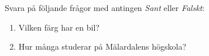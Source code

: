 

\newcommand{\CourseCode}{ABC123}
\newcommand{\CourseName}{Exempelkursen}
\newcommand{\CoursePoints}{7.5hp}

\newcommand{\Date}{1:a januari 2000}

\newcommand{\AllowedResources}{Förutom penna, sudd och svarspapper är inga hjälpmedel tillåtna!}

\newcommand{\GradeThree}{1}
\newcommand{\GradeFour}{2}
\newcommand{\GradeFive}{3}

\newcommand{\Examinator}{Förnamn Efternamn, som nås på telefon 021-000000.}


	
	
	\begin{q}Svara på följande frågor med antingen \textit{Sant} eller \textit{Falskt}:
		\begin{enumerate}
			\item Vilken färg har en bil? 
			\item Hur många studerar på Mälardalens högskola? 
		\end{enumerate}
	\end{q}
	
	
